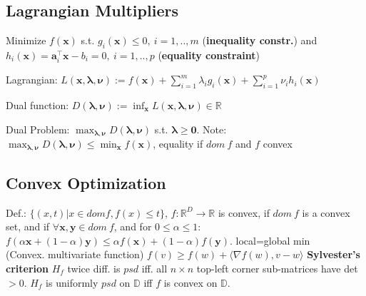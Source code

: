 
\subsection*{Lagrangian Multipliers}
Minimize  $f(\mathbf{x})$ s.t. $g_i(\mathbf{x}) \leq 0,\ i = 1, .., m$ (\textbf{inequality constr.}) and $h_i(\mathbf{x}) = \mathbf{a}_i^\top \mathbf{x} - b_i = 0,\ i = 1, .., p$ (\textbf{equality constraint})
\begin{compactdesc}
	\item[Lagrangian:] $L(\mathbf{x}, \boldsymbol{\lambda}, \boldsymbol{\nu}) := f(\mathbf{x}) + \sum_{i=1}^m \lambda_i g_i(\mathbf{x}) + \sum_{i=1}^p \nu_i h_i(\mathbf{x})$
	\item[Dual function:] $D(\boldsymbol{\lambda}, \boldsymbol{\nu}) := \inf_{\mathbf{x}} L(\mathbf{x}, \boldsymbol{\lambda}, \boldsymbol{\nu}) \in \mathbb{R}$
	\item[Dual Problem:] $\max_{\boldsymbol{\lambda}, \boldsymbol{\nu}} D(\boldsymbol{\lambda}, \boldsymbol{\nu})$ s.t. $\boldsymbol{\lambda} \geq \mathbf{0}$. Note: $\max_{\boldsymbol{\lambda}, \boldsymbol{\nu}} D(\boldsymbol{\lambda}, \boldsymbol{\nu}) \le \min_\mathbf{x}{f(\mathbf{x})}$, equality if $dom\ f$ and $f$ convex
\end{compactdesc}

\subsection*{Convex Optimization}
Def.: $\{(x,t)|x \in dom f, f(x) \leq t\}$, $f : \mathbb{R}^D \rightarrow \mathbb{R}$ is convex, if $dom\ f$ is a convex set, and if $\forall \mathbf{x}, \mathbf{y} \in dom\ f$, and for $0 \leq \alpha \leq 1$: $f(\alpha \mathbf{x} + (1 - \alpha)\mathbf{y}) \leq \alpha f(\mathbf{x}) + (1-\alpha)f(\mathbf{y})$. local=global min \\
(Convex. multivariate function) $f(v) \geq f(w) + \langle \nabla f(w), v - w \rangle$
\textbf{Sylvester's criterion} $H_f$ twice diff. is $psd$ iff. all $n\times{} n$ top-left corner sub-matrices have det $ > 0$. $H_f $ is uniformly $psd$ on $\mathbb{D}$ iff $f$ is convex on $\mathbb{D}$.


